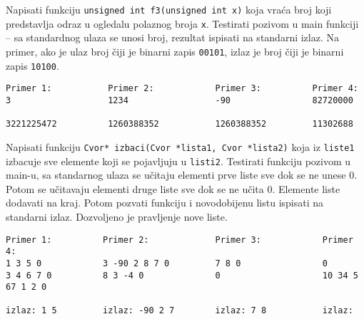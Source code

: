 \begin{z}
 Napisati funkciju  \verb|unsigned int f3(unsigned int x)| koja vra\' ca broj koji predstavlja odraz u ogledalu
polaznog broja \verb|x|. Testirati pozivom u main funkciji -- sa standardnog ulaza se unosi broj, rezultat ispisati na standarni izlaz.
 Na primer, ako je ulaz broj \v ciji je binarni zapis \verb|00101|, izlaz je broj \v ciji je binarni zapis \verb|10100|.
\end{z}
\begin{verbatim}
Primer 1:           Primer 2:            Primer 3:          Primer 4:
3                   1234                 -90                82720000

3221225472          1260388352           1260388352         11302688
\end{verbatim}

\begin{z}
Napisati funkciju \verb|Cvor* izbaci(Cvor *lista1, Cvor *lista2)|  koja iz \verb|liste1|
izbacuje sve elemente koji se pojavljuju u \verb|listi2|. Testirati funkciju pozivom u main-u,
sa standarnog ulaza se u\v citaju elementi prve liste sve dok se ne unese 0.
Potom se u\v citavaju elementi druge liste sve dok se ne u\v cita 0. Elemente liste dodavati na kraj.
Potom pozvati funkciju i novodobijenu listu ispisati na standarni izlaz.
Dozvoljeno je pravljenje nove liste.
\end{z}
\begin{verbatim}
Primer 1:          Primer 2:             Primer 3:            Primer 4:
1 3 5 0            3 -90 2 8 7 0         7 8 0                0
3 4 6 7 0          8 3 -4 0              0                    10 34 5 67 1 2 0

izlaz: 1 5         izlaz: -90 2 7        izlaz: 7 8           izlaz:
\end{verbatim}


